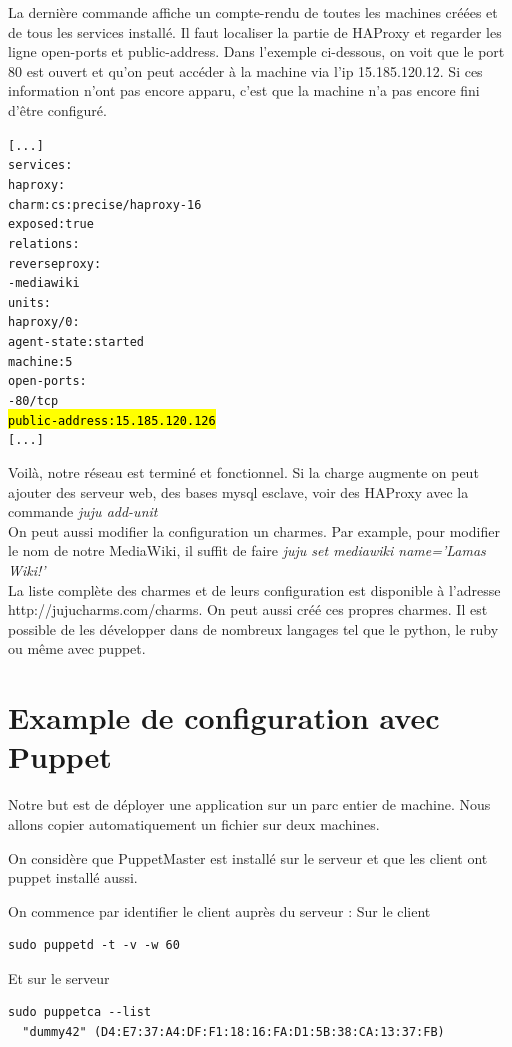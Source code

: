 \documentclass[a4paper,oneside]{report}
\begin{document}
La dernière commande affiche un compte-rendu de toutes les machines créées et de tous les services installé. Il faut localiser la partie de HAProxy et regarder les ligne open-ports et public-address. Dans l'exemple ci-dessous, on voit que le port 80 est ouvert et qu'on peut accéder à la machine via l'ip 15.185.120.12. Si ces information n'ont pas encore apparu, c'est que la machine n'a pas encore fini d'être configuré. 
\begin{alltt}
[...]
services:
  haproxy:
    charm: cs:precise/haproxy-16
    exposed: true
    relations:
      reverseproxy:
      - mediawiki
    units:
      haproxy/0:
        agent-state: started
        machine: 5
        open-ports:
        - 80/tcp
        \hl{public-address: 15.185.120.126}
[...]
\end{alltt}

Voilà, notre réseau est terminé et fonctionnel. Si la charge augmente on peut ajouter des serveur web, des bases mysql esclave, voir des HAProxy avec la commande \emph{juju add-unit}\\
On peut aussi modifier la configuration un charmes. Par example, pour modifier le nom de notre MediaWiki, il suffit de faire \emph{juju set mediawiki name='Lamas Wiki!'}\\
La liste complète des charmes et de leurs configuration est disponible à l'adresse http://jujucharms.com/charms.
On peut aussi créé ces propres charmes. Il est possible de les développer dans de nombreux langages tel que le python, le ruby ou même avec puppet.
\newpage
\section{Example de configuration avec Puppet} \label{auto:puppet}
Notre but est de déployer une application sur un parc entier de machine.
Nous allons copier automatiquement un fichier sur deux machines.

On considère que PuppetMaster est installé sur le serveur et que les client ont puppet installé aussi.


On commence par identifier le client auprès du serveur :
Sur le client
\begin{verbatim}
sudo puppetd -t -v -w 60
\end{verbatim}

Et sur le serveur
\begin{verbatim}
sudo puppetca --list
  "dummy42" (D4:E7:37:A4:DF:F1:18:16:FA:D1:5B:38:CA:13:37:FB)
\end{verbatim}
\end{document}
